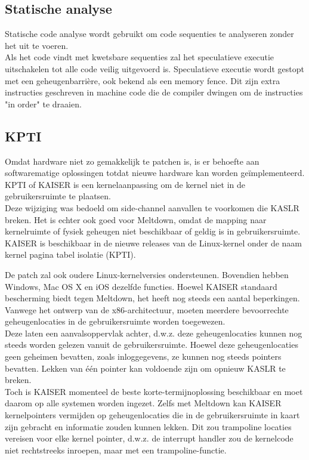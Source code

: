 \subsection{Statische analyse}
Statische code analyse wordt gebruikt om code sequenties te analyseren zonder het uit te voeren.\\ Als het code vindt met kwetsbare sequenties zal het speculatieve executie uitschakelen tot alle code veilig uitgevoerd is.
Speculatieve executie wordt gestopt met een geheugenbarrière, ook bekend als een memory fence. Dit zijn extra instructies geschreven in machine code die de compiler dwingen om de instructies "in order" te draaien.


\subsection{KPTI}
Omdat hardware niet zo gemakkelijk te patchen is, is er behoefte aan
softwarematige oplossingen totdat nieuwe hardware kan worden geïmplementeerd.
KPTI of KAISER is een kernelaanpassing
om de kernel niet in de gebruikersruimte te plaatsen.\\
Deze wijziging was bedoeld om side-channel aanvallen te voorkomen
die KASLR breken. Het is echter ook
goed voor Meltdown, omdat de mapping naar kernelruimte of fysiek geheugen niet beschikbaar of geldig is 
in gebruikersruimte. KAISER is beschikbaar in de nieuwe
releases van de Linux-kernel onder de naam kernel
pagina tabel isolatie (KPTI). 

De patch zal ook
oudere Linux-kernelversies ondersteunen. Bovendien hebben Windows, Mac OS X en iOS dezelfde functies.
Hoewel KAISER standaard bescherming biedt tegen
Meltdown, het heeft nog steeds een aantal beperkingen. Vanwege het ontwerp
van de x86-architectuur, moeten meerdere bevoorrechte geheugenlocaties
 in de gebruikersruimte worden toegewezen.\\ Deze
laten een aanvalsoppervlak achter, d.w.z. deze
geheugenlocaties kunnen nog steeds worden gelezen vanuit de gebruikersruimte. 
Hoewel deze geheugenlocaties geen geheimen bevatten,
zoals inloggegevens, ze kunnen nog steeds pointers bevatten.
Lekken van één pointer kan voldoende zijn om opnieuw KASLR te breken.\\
Toch is KAISER momenteel de beste korte-termijnoplossing
beschikbaar en moet daarom op alle systemen worden ingezet. Zelfs met Meltdown kan KAISER kernelpointers
vermijden op geheugenlocaties
die in de gebruikersruimte in kaart zijn gebracht en informatie zouden kunnen lekken. Dit zou 
trampoline locaties vereisen voor elke kernel pointer, d.w.z.
de interrupt handler zou de kernelcode niet rechtstreeks inroepen,
maar met een trampoline-functie.

